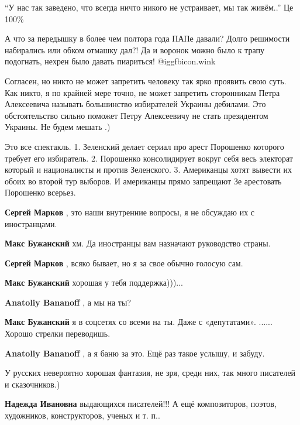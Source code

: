 \begin{itemize}
\enquote{У нас так заведено, что всегда ничто никого не устраивает, мы так живём..} Це 100\%


А что за передышку в более чем полтора года ПАПе давали? Долго решимости
набирались или обком отмашку дал?! Да и воронок можно было к трапу подогнать,
нехрен было давать пиариться!  @igg{fbicon.wink} 


Согласен, но никто не может запретить человеку так ярко проявить свою суть.
Как никто, я по крайней мере точно, не может запретить сторонникам Петра
Алексеевича называть большинство избирателей Украины дебилами. Это
обстоятельство сильно поможет Петру Алексеевичу не стать президентом Украины.
Не будем мешать .)


Это все спектакль. 1. Зеленский делает сериал про арест Порошенко которого
требует его избиратель. 2. Порошенко консолидирует вокруг себя весь электорат
который и националисты и против Зеленского. 3. Американцы хотят вывести их
обоих во второй тур выборов. И американцы прямо запрещают Зе арестовать
Порошенко всерьез.

\begin{itemize} %
\textbf{Сергей Марков} , это наши внутренние вопросы, я не обсуждаю их с иностранцами.


\textbf{Макс Бужанский} хм. Да иностранцы вам назначают руководство страны.

\textbf{Сергей Марков} , всяко бывает, но я за свое обычно голосую сам.

\textbf{Макс Бужанский} хорошая у тебя поддержка)))...

\textbf{Anatoliy Bananoff} , а мы на ты?

\textbf{Макс Бужанский} я в соцсетях со всеми на ты. Даже с «депутатами».
......
Хорошо стрелки переводишь.

\textbf{Anatoliy Bananoff} , а я баню за это.
Ещё раз такое услышу, и забуду.

У русских невероятно хорошая фантазия, не зря, среди них, так много писателей и сказочников.)

\textbf{Надежда Ивановна} выдающихся писателей!!! А ещё композиторов, поэтов, художников, конструкторов, ученых и т. п..


\end{itemize}
\end{itemize}
